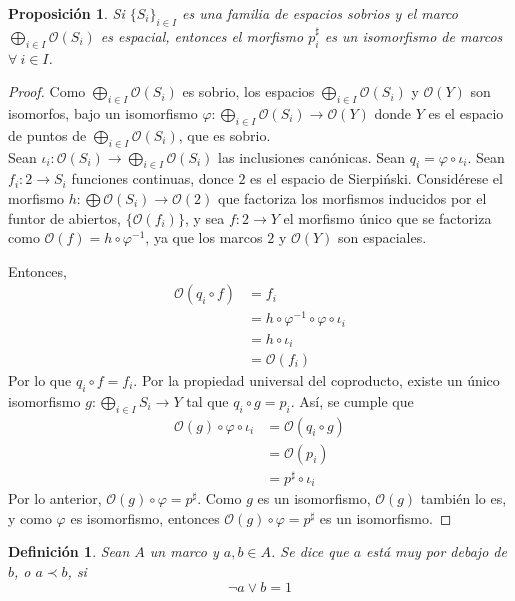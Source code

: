 \documentclass[12pt,letterpaper,titlepage]{article}
\newtheorem*{defn}{Definición}
\newtheorem*{prop}{Proposición}
\theoremstyle{definition}
\renewcommand\sup{\vee}
\newcommand\<{\langle}
\renewcommand\>{\rangle}
\begin{document}
\begin{prop}
Si $\{S_i\}_{i\in I}$ es una familia de espacios sobrios y el marco $\bigoplus\limits_{i\in I}\mathcal{O}(S_i)$ es espacial, entonces el morfismo $p_i^{\sharp}$ es un isomorfismo de marcos $\forall \ i \in I$.
\end{prop}
\begin{proof}
Como $\bigoplus\limits_{i\in I}\mathcal{O}(S_i)$ es sobrio, los espacios $\bigoplus\limits_{i\in I}\mathcal{O}(S_i)$ y $\mathcal{O}(Y)$ son isomorfos, bajo un isomorfismo $\varphi:\bigoplus\limits_{i\in I}\mathcal{O}(S_i)\to\mathcal{O}(Y)$ donde  $Y$ es el espacio de puntos de $\bigoplus\limits_{i\in I}\mathcal{O}(S_i)$, que es sobrio.\\
Sean $\iota_i: \mathcal{O}(S_i)\to \bigoplus\limits_{i\in I}\mathcal{O}(S_i)$ las inclusiones canónicas. Sean $q_i=\varphi\circ\iota_i$. Sean $f_i:2\to S_i$ funciones continuas, donce $2$ es el espacio de Sierpi\'nski. Considérese el morfismo $h:\bigoplus\mathcal{O}(S_i)\to\mathcal{O}(2)$ que factoriza los morfismos inducidos por el funtor de abiertos, $\{\mathcal{O}(f_i)\}$, y sea $f:2\to Y$ el morfismo único que se factoriza como $\mathcal{O}(f)=h\circ\varphi^{-1}$, ya que los marcos $2$ y $\mathcal{O}(Y)$ son espaciales.

Entonces, \begin{align*}
    \mathcal{O}(q_i\circ f)&=f_i\\
    &=h\circ\varphi^{-1}\circ\varphi\circ\iota_i\\
    &=h\circ\iota_i\\
    &=\mathcal{O}(f_i)
\end{align*}
Por lo que $q_i\circ f=f_i$. Por la propiedad universal del coproducto, existe un único isomorfismo $g:\bigoplus\limits_{i\in I}S_i\to Y$ tal que $q_i\circ g=p_i$. Así, se cumple que 
\begin{align*}
    \mathcal{O}(g)\circ\varphi\circ\iota_i&=\mathcal{O}(q_i\circ g)\\
    &=\mathcal{O}(p_i)\\
    &=p^\sharp\circ\iota_i
\end{align*}
Por lo anterior, $\mathcal{O}(g)\circ\varphi=p^\sharp$. Como $g$ es un isomorfismo, $\mathcal{O}(g)$ también lo es, y como $\varphi$ es isomorfismo, entonces $\mathcal{O}(g)\circ\varphi=p^\sharp$ es un isomorfismo.
\end{proof}
\begin{defn}
    Sean $A$ un marco y $a,b\in A$. Se dice que $a$ está muy por debajo de $b$, o $a\prec b$, si 
    $$\neg a\sup b=1$$
\end{defn}
\end{document}
